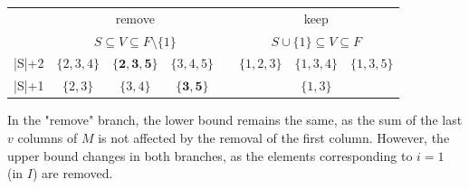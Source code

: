 \documentclass[11pt,a4paper,openright,twoside]{article}
\begin{document}
\begin{table}[h!]
\centering
\begin{tabular}{c|ccccccc}
 & \multicolumn{3}{c}{remove} & & \multicolumn{3}{c}{keep}\\
 & \multicolumn{3}{c}{$S\subseteq V\subseteq F\setminus\{1\}$} & & \multicolumn{3}{c}{$S\cup\{1\}\subseteq V\subseteq F$}\\
\cline{2-4} \cline{6-8}
|S|+2 & $\{2,3,4\}$ & $\mathbf{\{2,3,5\}}$ & $\{3,4,5\}$ & & $\{1,2,3\}$ & $\{1,3,4\}$ & $\{1,3,5\}$ \\
|S|+1 & $\{2,3\}$ & $\{3,4\}$ & $\mathbf{\{3,5\}}$ & & & $\{1,3\}$ &  \\
\end{tabular}
\end{table}

In the "remove" branch, the lower bound remains the same, as the sum of the last $v$ columns of $M$ is not affected by the removal of the first column. However, the upper bound changes in both branches, as the elements corresponding to $i=1$ (in $I$) are removed.
\end{document}
